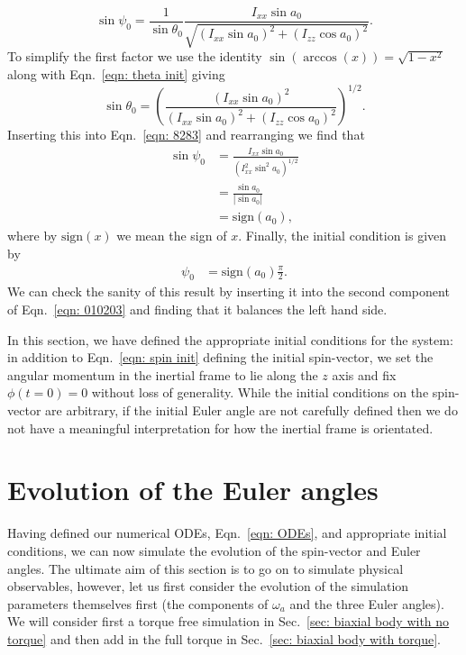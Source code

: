 \documentclass[../full_thesis/full_thesis.tex]{subfiles}
\begin{document}
\begin{equation}
\sin\psi_{0} =\frac{1}{ \sin\theta_{0}}
\frac{ I_{xx}\sin a_{0}}{\sqrt{(I_{xx}\sin a_{0})^{2} + (I_{zz}\cos a_{0})^{2}}}.
\label{eqn: 8283}
\end{equation}
To simplify the first factor we use the identity $\sin(\arccos(x)) = \sqrt{1 - x^{2}}$
along with Eqn.~\eqref{eqn:  theta init} giving
\begin{equation}
\sin\theta_{0} = \left(\frac{(I_{xx}\sin a_{0})^{2}}
                  {(I_{xx}\sin a_{0})^{2} + (I_{zz}\cos a_{0})^{2}} \right)^{1/2}.
\end{equation}
Inserting this into Eqn.~\eqref{eqn: 8283} and rearranging we find that
\begin{align}
\sin \psi_0 & = \frac{I_{xx} \sin a_{0}}{\left(I_{xx}^{2} \sin^{2} a_{0}\right)^{1/2}} \\
 & = \frac{\sin a_{0} }{|\sin a_{0}|} \\
& = \mathrm{sign}(a_{0}),
\end{align}
where by $\mathrm{sign}(x)$ we mean the sign of $x$. Finally, the initial
condition is given by
\begin{align}
\psi_{0} & =\mathrm{sign}(a_{0}) \frac{\pi}{2}.
\label{eqn: psi  init}
\end{align}
We can check the sanity of this result by inserting it into the second component of
Eqn.~\eqref{eqn: 010203} and finding that it balances the left hand side.

In this section, we have defined the appropriate initial conditions for the
system: in addition to Eqn.~\eqref{eqn: spin init} defining the initial spin-vector,
we set the angular momentum in the inertial frame to lie along the
$z$ axis and fix $\phi(t=0)=0$ without loss of generality.  While the
initial conditions on the spin-vector are arbitrary, if the initial Euler angle
are not carefully defined then we do not have a meaningful interpretation for
how the inertial frame is orientated.

\section{Evolution of the Euler angles}

Having defined our numerical ODEs, Eqn.~\eqref{eqn: ODEs}, and appropriate
initial conditions, we can now simulate the evolution of the spin-vector and
Euler angles. The ultimate aim of this section is to go on to simulate physical
observables, however, let us first consider the evolution of the simulation
parameters themselves first (the components of $\omega_a$ and the three Euler
angles). We will consider first a torque free simulation in Sec.~\ref{sec:
biaxial body with no torque} and then add in the full torque in Sec.~\ref{sec:
biaxial body with torque}.
\end{document}
